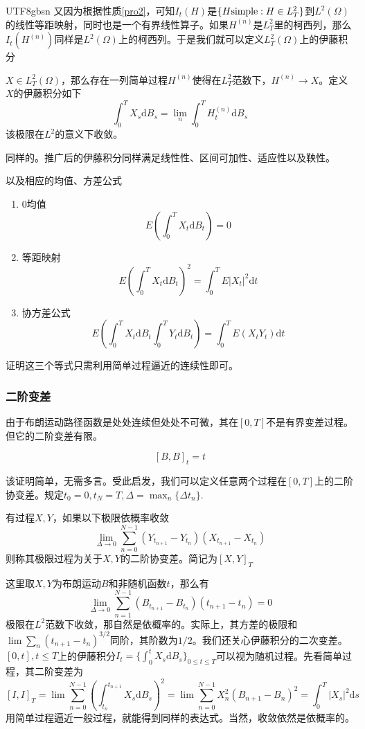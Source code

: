 \documentclass{article}
\begin{document}
\begin{CJK*}{UTF8}{gbsn}
又因为根据性质\ref{pro2}，可知$I_t(H)$是$\{H\space\text{simple}:H\in L_T^2\}$到$L^2(\Omega)$的线性等距映射，同时也是一个有界线性算子。如果$H^{(n)}$是$L_T^2$里的柯西列，那么$I_t(H^{(n)})$同样是$L^2(\Omega)$上的柯西列。于是我们就可以定义$L^2_T(\Omega)$上的伊藤积分
\begin{definition}
    $X\in L^2_T(\Omega)$，那么存在一列简单过程$H^{(n)}$使得在$L^2_T$范数下，$H^{(n)}\to X$。定义$X$的伊藤积分如下
    $$\int_0^TX_s\mathrm{d}B_s=\lim_n\int_0^TH_t^{(n)}\mathrm{d}B_s$$
    该极限在$L^2$的意义下收敛。
\end{definition}
同样的。推广后的伊藤积分同样满足线性性、区间可加性、适应性以及鞅性。

以及相应的均值、方差公式
\begin{enumerate}
    \item 0均值$$E\left(\int_0^TX_t\mathrm{d}B_t\right)=0 $$
    \item 等距映射$$E\left(\int_0^TX_t\mathrm{d}B_t\right)^2=\int_0^TE|X_t|^2\mathrm{d}t$$
    \item 协方差公式
    $$E\left(\int_0^TX_t\mathrm{d}B_t\int_0^TY_t\mathrm{d}B_t\right)=\int_0^TE(X_tY_t)\mathrm{d}t$$
\end{enumerate}
证明这三个等式只需利用简单过程逼近的连续性即可。

\subsubsection{二阶变差}
由于布朗运动路径函数是处处连续但处处不可微，其在$[0,T]$不是有界变差过程。但它的二阶变差有限。
\begin{lemma}[布朗运动的二阶变差]
    $$[B,B]_t=t$$
\end{lemma}
该证明简单，无需多言。受此启发，我们可以定义任意两个过程在$[0,T]$上的二阶协变差。规定$t_0=0,t_N=T,\Delta=\max_n\{\Delta t_n\}$.
\begin{definition}
    有过程$X,Y$，如果以下极限依概率收敛
    $$
    \lim_{\Delta\to0}\sum_{n=0}^{N-1}(Y_{t_{n+1}}-Y_{t_{n}})(X_{t_{n+1}}-X_{t_{n}})
    $$
    则称其极限过程为关于$X,Y$的二阶协变差。简记为$[X,Y]_T$
\end{definition}
这里取$X,Y$为布朗运动$B$和非随机函数$t$，那么有
$$
\lim_{\Delta\to0}\sum_{n=1}^{N-1}(B_{t_{n+1}}-B_{t_{n}})({t_{n+1}}-{t_{n}})=0
$$
极限在$L^2$范数下收敛，那自然是依概率的。实际上，其方差的极限和$\lim\sum_n(t_{n+1}-t_{n})^{3/2}$同阶，其阶数为$1/2$。我们还关心伊藤积分的二次变差。$[0,t],t\le T$上的伊藤积分$I_t=\{\int_0^tX_s\mathrm{d}B_s\}_{0\le t\le T}$可以视为随机过程。先看简单过程，其二阶变差为
$$
[I,I]_T=\lim\sum_{n=0}^{N-1}(\int_{t_n}^{t_{n+1}}X_s\mathrm{d}B_s)^2=\lim\sum_{n=0}^{N-1}X_n^2(B_{n+1}-B_n)^2
=\int_0^T|X_s|^2\mathrm{d}s
$$
用简单过程逼近一般过程，就能得到同样的表达式。当然，收敛依然是依概率的。



\end{CJK*}
\end{document}
